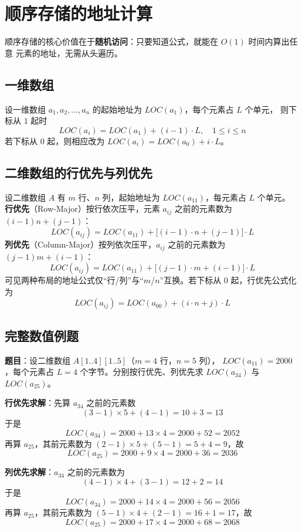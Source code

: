 \section{顺序存储的地址计算}

顺序存储的核心价值在于\textbf{随机访问}：只要知道公式，就能在 $O(1)$ 时间内算出任意
元素的地址，无需从头遍历。

\subsection{一维数组}

设一维数组 $a_1, a_2, \dots, a_n$ 的起始地址为 $LOC(a_1)$，每个元素占 $L$ 个单元，
则下标从 $1$ 起时
$$LOC(a_i) = LOC(a_1) + (i-1)\cdot L, \quad 1 \le i \le n$$
若下标从 $0$ 起，则相应改为 $LOC(a_i) = LOC(a_0) + i\cdot L$。

\subsection{二维数组的行优先与列优先}

设二维数组 $A$ 有 $m$ 行、$n$ 列，起始地址为 $LOC(a_{11})$，每元素占 $L$ 个单元。
\textbf{行优先}（Row-Major）按行依次压平，元素 $a_{ij}$ 之前的元素数为 $(i-1)n+(j-1)$：
$$LOC(a_{ij}) = LOC(a_{11}) + \big[(i-1)\cdot n + (j-1)\big]\cdot L$$
\textbf{列优先}（Column-Major）按列依次压平，$a_{ij}$ 之前的元素数为 $(j-1)m+(i-1)$：
$$LOC(a_{ij}) = LOC(a_{11}) + \big[(j-1)\cdot m + (i-1)\big]\cdot L$$
可见两种布局的地址公式仅“行/列”与“$m$/$n$”互换。若下标从 $0$ 起，行优先公式化为
$$LOC(a_{ij}) = LOC(a_{00}) + (i\cdot n + j)\cdot L$$

\subsection{完整数值例题}

\textbf{题目}：设二维数组 $A[1..4][1..5]$（$m = 4$ 行，$n = 5$ 列），
$LOC(a_{11}) = 2000$，每个元素占 $L = 4$ 个字节。分别按行优先、列优先求
$LOC(a_{34})$ 与 $LOC(a_{25})$。

\textbf{行优先求解}：先算 $a_{34}$ 之前的元素数
$$(3-1)\times 5 + (4-1) = 10 + 3 = 13$$
于是
$$LOC(a_{34}) = 2000 + 13 \times 4 = 2000 + 52 = 2052$$
再算 $a_{25}$，其前元素数为 $(2-1)\times 5 + (5-1) = 5 + 4 = 9$，故
$$LOC(a_{25}) = 2000 + 9 \times 4 = 2000 + 36 = 2036$$

\textbf{列优先求解}：$a_{34}$ 之前的元素数为
$$(4-1)\times 4 + (3-1) = 12 + 2 = 14$$
于是
$$LOC(a_{34}) = 2000 + 14 \times 4 = 2000 + 56 = 2056$$
再算 $a_{25}$，其前元素数为 $(5-1)\times 4 + (2-1) = 16 + 1 = 17$，故
$$LOC(a_{25}) = 2000 + 17 \times 4 = 2000 + 68 = 2068$$

